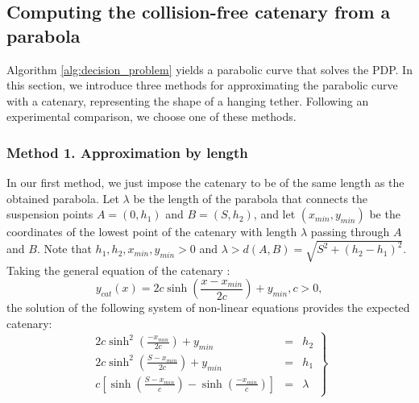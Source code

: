 


\subsection{Computing the collision-free catenary from a parabola}
\label{sec:approxlength}

Algorithm \ref{alg:decision_problem} yields a parabolic curve that solves the PDP. In this section, we introduce three methods for approximating the parabolic curve with a catenary, representing the shape of a hanging tether. Following an experimental comparison, we choose one of these methods.

\subsubsection{Method 1. Approximation by length}
\label{sec:bylength}
In our first method, we just impose the catenary to be of the same length as the obtained parabola. Let $\lambda$ be the length of the parabola that connects the suspension points $A=(0, h_1)$ and $B=(S, h_2)$, and let $(x_{min}, y_{min})$ be the coordinates of the lowest point of the catenary with length $\lambda$ passing through $A$ and $B$. Note that $h_1, h_2, x_{min},  y_{min} > 0$ and $\lambda > d(A,B)=\sqrt{S^2 +(h_2-h_1)^2}$.
Taking the general equation of the catenary \cite{hatibovic2020comparison}: 
\begin{equation}
y_{cat}(x)=2c\sinh\left(\frac{x-x_{min}}{2c}\right)+y_{min}, c>0,
\end{equation}
the solution of the following system of non-linear equations provides the expected catenary: 
\begin{equation}
\left.
    \begin{array}{lll}
    2c \sinh^2 {\left(\frac{-x_{min}}{2c}\right)} + y_{min} & = & h_2 \\
    2c \sinh^2 {\left(\frac{S-x_{min}}{2c}\right)} + y_{min} & = & h_1 \\
    c\left[ \sinh{\left( \frac{S-x_{min}}{c}\right)}-   \sinh{\left( \frac{-x_{min}}{c}\right)} \right] & = & \lambda
    \end{array}
    \right\}
\end{equation}

